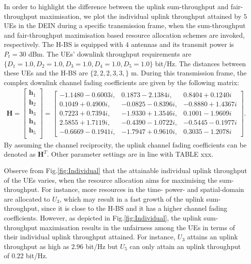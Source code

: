 \documentclass[12pt,draftcls,onecolumn,journal]{IEEEtran}
\begin{document}
In order to highlight the difference between the uplink sum-throughput and fair-throughput maximisation, we plot the individual uplink throughput attained by $5$ UEs in the DEIN during a specific transmission frame, when the sum-throughput and fair-throughput maximisation based resource allocation schemes are invoked, respectively. The H-BS is equipped with $4$ antennas and its transmit power is $P_t=30$ dBm. The UEs' downlink throughput requirements are $\{D_1=1.0, D_2=1.0, D_3=1.0, D_4=1.0, D_5=1.0\}$ bit/Hz. The distances between these UEs and the H-BS are $\{2,2,2,3,3,\}$ m. During this transmission frame, the complex downlink channel fading coefficients are given by the following matrix:
\begin{align}
	\mathbf{H} = \left[
		\begin{array}{l}
		\mathbf{h}_1 \\
		\mathbf{h}_2 \\
		\mathbf{h}_3 \\
		\mathbf{h}_4 \\
		\mathbf{h}_5 \\
		\end{array}
		\right] = \left[
		\begin{array}{lll}
			-1.1480 - 0.6003i, &   0.1873 - 2.1384i, &   0.8404 + 0.1240i \\
			0.1049 + 0.4900i, &  -0.0825 - 0.8396i, &  -0.8880 + 1.4367i  \\
 			0.7223 + 0.7394i, &  -1.9330 + 1.3546i, &   0.1001 - 1.9609i  \\
 			2.5855 + 1.7119i, &  -0.4390 - 1.0722i, &  -0.5445 - 0.1977i  \\
 			-0.6669 - 0.1941i, &  -1.7947 + 0.9610i, &   0.3035 - 1.2078i
		\end{array}
		\right].
\end{align}
By assuming the channel reciprocity, the uplink channel fading coefficients can be denoted as $\mathbf{H}^T$. Other parameter settings are in line with TABLE xxx.

Observe from Fig.\ref{fig:Individual} that the attainable individual uplink throughput of the UEs varies, when the resource allocation aims for maximising the sum-throughput. For instance, more resources in the time- power- and spatial-domain are allocated to $U_3$, which may result in a fast growth of the uplink sum-throughput, since it is close to the H-BS and it has a higher channel fading coefficients. However, as depicted in Fig.\ref{fig:Individual}, the uplink sum-throughput maximisation results in the unfairness among the UEs in terms of their individual uplink throughput attained. For instance, $U_3$ attains an uplink throughput as high as $2.96$ bit/Hz but $U_5$ can only attain an uplink throughput of $0.22$ bit/Hz.
\end{document}
